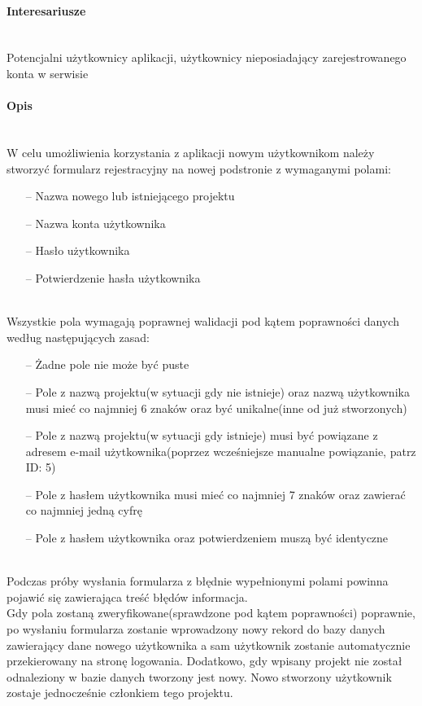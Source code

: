 \documentclass[eng,printmode]{mgr}
\begin{document}
\paragraph{Interesariusze}\ \\
Potencjalni użytkownicy aplikacji, użytkownicy nieposiadający zarejestrowanego konta w serwisie

\paragraph{Opis}\ \\
W celu umożliwienia korzystania z aplikacji nowym użytkownikom należy stworzyć formularz rejestracyjny na nowej podstronie z wymaganymi polami:
\begin{itemize}
	\item[--] Nazwa nowego lub istniejącego projektu
	\item[--] Nazwa konta użytkownika
	\item[--] Hasło użytkownika
	\item[--] Potwierdzenie hasła użytkownika
\end{itemize}
\ \\
Wszystkie pola wymagają poprawnej walidacji pod kątem poprawności danych według następujących zasad:
\begin{itemize}
	\item[--] Żadne pole nie może być puste
	\item[--] Pole z nazwą projektu(w sytuacji gdy nie istnieje) oraz nazwą użytkownika musi mieć co najmniej 6 znaków oraz być unikalne(inne od już stworzonych)
	\item[--] Pole z nazwą projektu(w sytuacji gdy istnieje) musi być powiązane z adresem e-mail użytkownika(poprzez wcześniejsze manualne powiązanie, patrz ID: 5)
	\item[--] Pole z hasłem użytkownika musi mieć co najmniej 7 znaków oraz zawierać co najmniej jedną cyfrę
	\item[--] Pole z hasłem użytkownika oraz potwierdzeniem muszą być identyczne
\end{itemize}
\ \\
Podczas próby wysłania formularza z błędnie wypełnionymi polami powinna pojawić się zawierająca treść błędów informacja.
\\
Gdy pola zostaną zweryfikowane(sprawdzone pod kątem poprawności) poprawnie, po wysłaniu formularza zostanie wprowadzony nowy rekord do bazy danych zawierający dane nowego użytkownika a sam użytkownik zostanie automatycznie przekierowany na stronę logowania. Dodatkowo, gdy wpisany projekt nie został odnaleziony w bazie danych tworzony jest nowy. Nowo stworzony użytkownik zostaje jednocześnie członkiem tego projektu.
\end{document}
